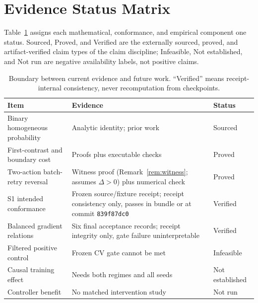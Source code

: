\documentclass{article}
\begin{document}
\section{Evidence Status Matrix}

Table~\ref{tab:status} assigns each mathematical, conformance, and empirical
component one status.  Sourced, Proved, and Verified are the externally
sourced, proved, and artifact-verified claim types of the claim discipline;
Infeasible, Not established, and Not run are negative availability labels, not
positive claims.

\begin{table}[h]
  \centering
  \caption{Boundary between current evidence and future work.  ``Verified''
  means receipt-internal consistency, never recomputation from checkpoints.}
  \label{tab:status}
  \begin{tabularx}{\linewidth}{lXl}
    \toprule
    Item & Evidence & Status \\
    \midrule
    Binary homogeneous probability & Analytic identity; prior work & Sourced \\
    First-contrast and boundary cost & Proofs plus executable checks & Proved \\
    Two-action batch-retry reversal & Witness proof (Remark~\ref{rem:witness}; assumes $\Delta>0$) plus numerical check & Proved \\
    S1 intended conformance & Frozen source/fixture receipt; receipt consistency only, passes in bundle or at commit \texttt{839f87dc0} & Verified \\
    Balanced gradient relations & Six final acceptance records; receipt integrity only, gate failure uninterpretable & Verified \\
    Filtered positive control & Frozen CV gate cannot be met & Infeasible \\
    Causal training effect & Needs both regimes and all seeds & Not established \\
    Controller benefit & No matched intervention study & Not run \\
    \bottomrule
  \end{tabularx}
\end{table}
\end{document}
